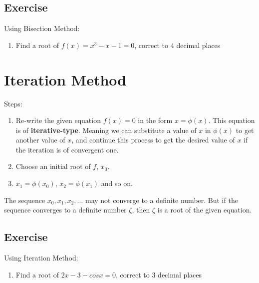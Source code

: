 \documentclass[aima203_lecturenotes_ku.tex]{subfiles}
\begin{document}
\subsection{Exercise}
Using Bisection Method:
\begin{enumerate}
\item Find a root of \(f(x)=x^3-x-1=0\), correct to \(4\) decimal places
\end{enumerate}

\section{Iteration Method}
Steps:
\begin{enumerate}
\item Re-write the given equation \(f(x)=0\) in the form \(x= \phi (x)\).
  This equation is of \textbf{iterative-type}. Meaning we can substitute a value of \(x\) in \(\phi (x)\) to get another value of \(x\), and continue this process to get the desired value of \(x\) if the iteration is of convergent one.
\item Choose an initial root of \(f\), \(x_0\).
\item \(x_1=\phi (x_0)\), \(x_2= \phi(x_1)\) and so on.
\end{enumerate}
The sequence \(x_0, x_1, x_2, ...\) may not converge to a definite number. But if the sequence converges to a definite number \(\zeta\), then \(\zeta\) is a root of the given equation.

\subsection{Exercise}
Using Iteration Method:
\begin{enumerate}
\item Find a root of \(2x-3-cosx=0\), correct to \(3\) decimal places
\end{enumerate}
\end{document}
